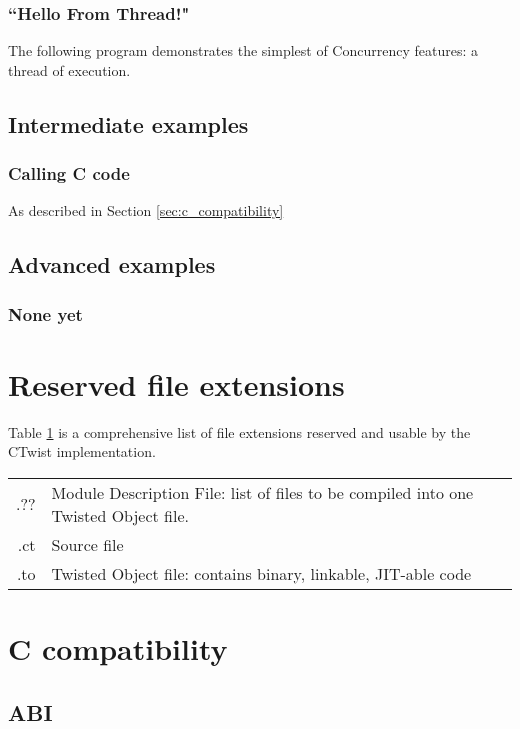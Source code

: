 \documentclass[a4paper,11pt]{article}
\begin{document}
    \subsubsection{``Hello From Thread!"}

The following program demonstrates the simplest of Concurrency features: a thread of execution.

  \subsection{Intermediate examples}
    \subsubsection{Calling C code}

As described in Section \ref{sec:c_compatibility}

  \subsection{Advanced examples}
    \subsubsection{None yet}

\appendix
\section{Reserved file extensions}
Table \ref{tab:file_extensions} is a comprehensive list of file extensions reserved and usable by the CTwist implementation.
\begin{table}[h] \label{tab:file_extensions}
\begin{tabular}{r|l}
.?? & Module Description File: list of files to be compiled into one Twisted Object file. \\
.ct & Source file \\
.to & Twisted Object file: contains binary, linkable, JIT-able code
\end{tabular}
\end{table}

\section{C compatibility}
\subsection{ABI}
\end{document}

